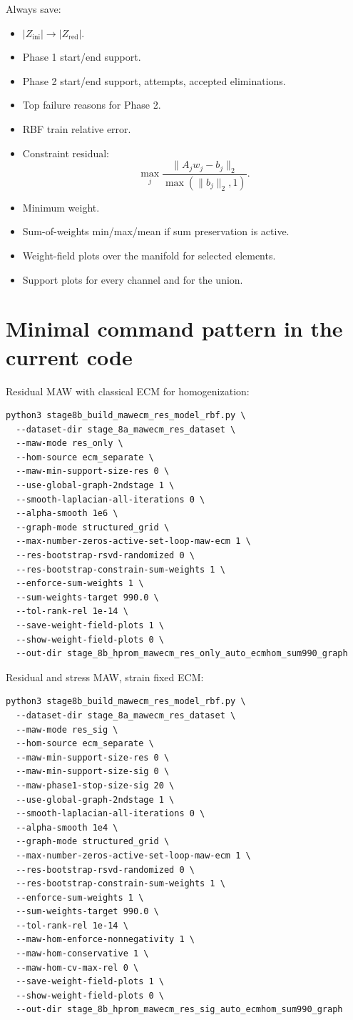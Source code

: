 \documentclass[11pt]{article}
\newcommand{\zinit}{Z_{\mathrm{ini}}}
\newcommand{\zred}{Z_{\mathrm{red}}}
\begin{document}
Always save:
\begin{itemize}
  \item \(|\zinit|\rightarrow|\zred|\).
  \item Phase 1 start/end support.
  \item Phase 2 start/end support, attempts, accepted eliminations.
  \item Top failure reasons for Phase 2.
  \item RBF train relative error.
  \item Constraint residual:
  \[
    \max_j\frac{\|A_jw_j-b_j\|_2}{\max(\|b_j\|_2,1)}.
  \]
  \item Minimum weight.
  \item Sum-of-weights min/max/mean if sum preservation is active.
  \item Weight-field plots over the manifold for selected elements.
  \item Support plots for every channel and for the union.
\end{itemize}

\section{Minimal command pattern in the current code}

Residual MAW with classical ECM for homogenization:
\begin{verbatim}
python3 stage8b_build_mawecm_res_model_rbf.py \
  --dataset-dir stage_8a_mawecm_res_dataset \
  --maw-mode res_only \
  --hom-source ecm_separate \
  --maw-min-support-size-res 0 \
  --use-global-graph-2ndstage 1 \
  --smooth-laplacian-all-iterations 0 \
  --alpha-smooth 1e6 \
  --graph-mode structured_grid \
  --max-number-zeros-active-set-loop-maw-ecm 1 \
  --res-bootstrap-rsvd-randomized 0 \
  --res-bootstrap-constrain-sum-weights 1 \
  --enforce-sum-weights 1 \
  --sum-weights-target 990.0 \
  --tol-rank-rel 1e-14 \
  --save-weight-field-plots 1 \
  --show-weight-field-plots 0 \
  --out-dir stage_8b_hprom_mawecm_res_only_auto_ecmhom_sum990_graph
\end{verbatim}

Residual and stress MAW, strain fixed ECM:
\begin{verbatim}
python3 stage8b_build_mawecm_res_model_rbf.py \
  --dataset-dir stage_8a_mawecm_res_dataset \
  --maw-mode res_sig \
  --hom-source ecm_separate \
  --maw-min-support-size-res 0 \
  --maw-min-support-size-sig 0 \
  --maw-phase1-stop-size-sig 20 \
  --use-global-graph-2ndstage 1 \
  --smooth-laplacian-all-iterations 0 \
  --alpha-smooth 1e4 \
  --graph-mode structured_grid \
  --max-number-zeros-active-set-loop-maw-ecm 1 \
  --res-bootstrap-rsvd-randomized 0 \
  --res-bootstrap-constrain-sum-weights 1 \
  --enforce-sum-weights 1 \
  --sum-weights-target 990.0 \
  --tol-rank-rel 1e-14 \
  --maw-hom-enforce-nonnegativity 1 \
  --maw-hom-conservative 1 \
  --maw-hom-cv-max-rel 0 \
  --save-weight-field-plots 1 \
  --show-weight-field-plots 0 \
  --out-dir stage_8b_hprom_mawecm_res_sig_auto_ecmhom_sum990_graph
\end{verbatim}
\end{document}
